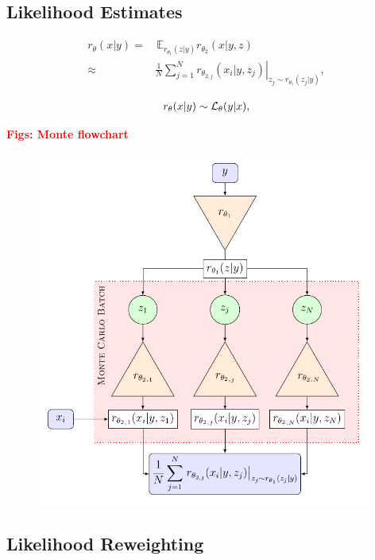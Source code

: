 \documentclass[aps,superscriptaddress,twocolumn,nopreprintnumbers,floatfix,groupedaddress]{revtex4-1}
\newcommand{\montefigwidth}{11cm}
\begin{document}
\subsection{Likelihood Estimates}

\begin{align}\label{eq:monte_approx}
	r_{\theta}(x|y) = & \,\mathbb{E}_{r_{\theta_1}(z|y)}r_{\theta_2}(x|y,z)\nonumber \\
	 \approx & \frac{1}{N}\sum^{N}_{j=1}\left.r_{\theta_{2,j}}(x_i|y,z_j)\right|_{z_j\sim r_{\theta_1}(z_j|y)},
\end{align}

\begin{align}\label{eq:post_like}
r_{\theta}(x|y) \sim {\cal L}_{\theta}(y|x),
\end{align}

\textbf{\textcolor{red}{Figs: Monte flowchart}}

\begin{figure}
	\centering
	\includegraphics[width=\montefigwidth]{figs/tikz_monte.pdf}
	\caption{}
	\label{fig:monte_flow}
\end{figure}


\subsection{Likelihood Reweighting}
\end{document}
